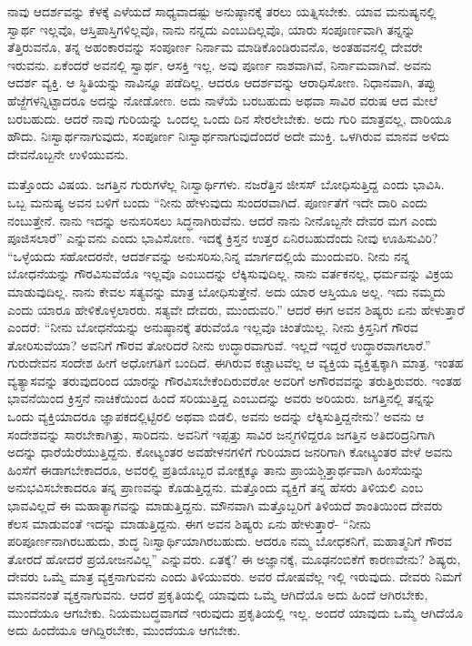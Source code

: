 ನಾವು ಆದರ್ಶವನ್ನು ಕೆಳಕ್ಕೆ ಎಳೆಯದೆ ಸಾಧ್ಯವಾದಷ್ಟು ಅನುಷ್ಠಾನಕ್ಕೆ ತರಲು ಯತ್ನಿಸಬೇಕು. ಯಾವ ಮನುಷ್ಯನಲ್ಲಿ ಸ್ವಾರ್ಥ ಇಲ್ಲವೊ, ಆಸ್ತಿಪಾಸ್ತಿಗಳಿಲ್ಲವೊ, ನಾನು ನನ್ನದು ಎಂಬುದಿಲ್ಲವೊ, ಯಾರು ಸಂಪೂರ್ಣವಾಗಿ ತನ್ನನ್ನು ತೆತ್ತಿರುವನೊ, ತನ್ನ ಅಹಂಕಾರವನ್ನು ಸಂಪೂರ್ಣ ನಿರ್ನಾಮ ಮಾಡಿಕೊಂಡಿರುವನೊ, ಅಂತಹವನಲ್ಲಿ ದೇವರೇ ಇರುವನು. ಏಕೆಂದರೆ ಅವನಲ್ಲಿ ಸ್ವಾರ್ಥ, ಆಸಕ್ತಿ ಇಲ್ಲ. ಅವು ಪೂರ್ಣ ನಾಶವಾಗಿವೆ, ನಿರ್ನಾಮ\-ವಾಗಿವೆ. ಅವನು ಆದರ್ಶ ವ್ಯಕ್ತಿ. ಆ ಸ್ಥಿತಿಯನ್ನು ನಾವಿನ್ನೂ ಪಡೆದಿಲ್ಲ. ಆದರೂ ಆದರ್ಶವನ್ನು ಆರಾಧಿಸೋಣ. ನಿಧಾನವಾಗಿ, ತಪ್ಪು ಹೆಜ್ಜೆಗಳನ್ನಿಟ್ಟಾದರೂ ಅದನ್ನು ನೋಡೋಣ. ಅದು ನಾಳೆಯೆ ಬರಬಹುದು ಅಥವಾ ಸಾವಿರ ವರುಷ ಆದ ಮೇಲೆ ಬರಬಹುದು. ಆದರೆ ನಾವು ಗುರಿಯನ್ನು ಒಂದಲ್ಲ ಒಂದು ದಿನ ಸೇರಲೇಬೇಕು. ಅದು ಗುರಿ ಮಾತ್ರವಲ್ಲ, ದಾರಿಯೂ ಹೌದು. ನಿಃಸ್ವಾರ್ಥನಾಗುವುದು, ಸಂಪೂರ್ಣ ನಿಃಸ್ವಾರ್ಥನಾಗುವುದೆಂದರೆ ಅದೇ ಮುಕ್ತಿ. ಒಳಗಿರುವ ಮಾನವ ಅಳಿದು ದೇವನೊಬ್ಬನೇ ಉಳಿಯುವನು.

ಮತ್ತೊಂದು ವಿಷಯ. ಜಗತ್ತಿನ ಗುರುಗಳೆಲ್ಲ ನಿಃಸ್ವಾರ್ಥಿಗಳು. ನಜರೆತ್ತಿನ ಜೀಸಸ್​ ಬೋಧಿಸುತ್ತಿದ್ದ ಎಂದು ಭಾವಿಸಿ. ಒಬ್ಬ ಮನುಷ್ಯ ಅವನ ಬಳಿಗೆ ಬಂದು “ನೀನು ಹೇಳುವುದು ಸುಂದರವಾಗಿದೆ. ಪೂರ್ಣತೆಗೆ ಇದೇ ದಾರಿ ಎಂದು ನಂಬುತ್ತೇನೆ. ನಾನು ಇದನ್ನು ಅನುಸರಿಸಲು ಸಿದ್ಧನಾಗಿರುವೆನು. ಆದರೆ ನಾನು ನೀನೊಬ್ಬನೇ ದೇವರ ಮಗ ಎಂದು ಪೂಜಿಸಲಾರೆ” ಎನ್ನುವನು ಎಂದು ಭಾವಿಸೋಣ. ಇದಕ್ಕೆ ಕ್ರಿಸ್ತನ ಉತ್ತರ ಏನಿರಬಹುದೆಂದು ನೀವು ಊಹಿಸುವಿರಿ? “ಒಳ್ಳೆಯದು ಸಹೋದರನೇ, ಆದರ್ಶವನ್ನು ಅನುಸರಿಸು,\break ನಿನ್ನ ಮಾರ್ಗದಲ್ಲಿಯೆ ಮುಂದುವರಿ. ನೀನು ನನ್ನ ಬೋಧನೆಯನ್ನು ಗೌರವಿಸುವೆಯೊ ಇಲ್ಲವೊ ಎಂಬುದನ್ನು ಲೆಕ್ಕಿಸುವುದಿಲ್ಲ. ನಾನು ವರ್ತಕನಲ್ಲ, ಧರ್ಮವನ್ನು ವಿಕ್ರಯ ಮಾಡುವುದಿಲ್ಲ. ನಾನು ಕೇವಲ ಸತ್ಯವನ್ನು ಮಾತ್ರ ಬೋಧಿಸುತ್ತೇನೆ. ಅದು ಯಾರ ಆಸ್ತಿಯೂ ಅಲ್ಲ. ಇದು ನಮ್ಮದು ಎಂದು ಯಾರೂ ಹೇಳಿಕೊಳ್ಳಲಾರರು. ಸತ್ಯವೇ ದೇವರು, ಮುಂದುವರಿ.” ಆದರೆ ಈಗ ಅವನ ಶಿಷ್ಯರು ಏನು ಹೇಳುತ್ತಾರೆ ಎಂದರೆ: “ನೀನು ಬೋಧನೆಯನ್ನು ಅನುಷ್ಠಾನಕ್ಕೆ ತರುವೆಯೊ ಇಲ್ಲವೊ ಚಿಂತೆಯಿಲ್ಲ. ನೀನು ಕ್ರಿಸ್ತನಿಗೆ ಗೌರವ ತೋರಿಸುವೆಯಾ? ಅವನಿಗೆ ಗೌರವ ತೋರಿದರೆ ನೀನು ಉದ್ಧಾರವಾಗುವೆ. ಇಲ್ಲದೆ ಇದ್ದರೆ ಉದ್ಧಾರವಾಗಲಾರೆ.” ಗುರುದೇವನ ಸಂದೇಶ ಹೀಗೆ ಅಧೋಗತಿಗೆ ಬಂದಿದೆ. ಈಗಿರುವ ಕಚ್ಚಾಟವೆಲ್ಲ ಆ ವ್ಯಕ್ತಿಯ ವ್ಯಕ್ತಿತ್ವಕ್ಕಾಗಿ ಮಾತ್ರ. ಇಂತಹ ವ್ಯತ್ಯಾಸವನ್ನು ತರುವುದರಿಂದ ಯಾರನ್ನು ಗೌರವಿಸಬೇಕೆಂದಿರುವರೋ ಅವರಿಗೆ ಅಗೌರವವನ್ನು ತರುತ್ತಿರುವರು. ಇಂತಹ ಭಾವನೆಯಿಂದ ಕ್ರಿಸ್ತನೆ ನಾಚಿಕೆಯಿಂದ ಹಿಂದೆ ಸರಿಯುತ್ತಿದ್ದ ಎಂಬುದನ್ನು ಅವರು ಅರಿಯರು. ಜಗತ್ತಿನಲ್ಲಿ ತನ್ನನ್ನು ಒಂದು ವ್ಯಕ್ತಿಯಾದರೂ ಜ್ಞಾಪಕದಲ್ಲಿಟ್ಟಿರಲಿ ಅಥವಾ ಬಿಡಲಿ, ಅವನು ಅದನ್ನು ಲೆಕ್ಕಿಸುತ್ತಿದ್ದನೇನು? ಅವನು ಆ ಸಂದೇಶವನ್ನು ಸಾರಬೇಕಾಗಿತ್ತು, ಸಾರಿದನು. ಅವನಿಗೆ ಇಪ್ಪತ್ತು ಸಾವಿರ ಜನ್ಮಗಳಿದ್ದರೂ ಜಗತ್ತಿನ ಅತಿದರಿದ್ರನಿಗಾಗಿ ಅದನ್ನು ಧಾರೆಯೆರೆಯುತ್ತಿದ್ದನು. ಕೋಟ್ಯಂತರ ಅವಹೇಳನಗಳಿಗೆ ಗುರಿಯಾದ ಜನರಿಗಾಗಿ ಕೋಟ್ಯಂತರ ವೇಳೆ ಅವನು ಹಿಂಸೆಗೆ ಈಡಾಗಬೇಕಾದರೂ, ಅವರಲ್ಲಿ ಪ್ರತಿಯೊಬ್ಬರ ಮೋಕ್ಷಕ್ಕೂ ತಾನು ಪ್ರಾಯಶ್ಚಿತ್ತಾರ್ಥವಾಗಿ ಹಿಂಸೆಯನ್ನು ಅನುಭವಿಸಬೇಕಾದರೂ ತನ್ನ ಪ್ರಾಣವನ್ನು ಕೊಡುತ್ತಿದ್ದನು. ಮತ್ತೊಂದು ವ್ಯಕ್ತಿಗೆ ತನ್ನ ಹೆಸರು ತಿಳಿಯಲಿ ಎಂಬ ಭಾವವಿಲ್ಲದೆ ಈ ಮಹಾತ್ಯಾಗವನ್ನು ಮಾಡುತ್ತಿದ್ದನು. ಮೌನವಾಗಿ ಮತ್ತೊಬ್ಬರಿಗೆ ತಿಳಿಯದೆ ಶಾಂತಿಯಿಂದ ದೇವರು ಕೆಲಸ ಮಾಡುವಂತೆ ಇದನ್ನು ಮಾಡುತ್ತಿದ್ದನು. ಈಗ ಅವನ ಶಿಷ್ಯರು ಏನು ಹೇಳುತ್ತಾರೆ- “ನೀನು ಪರಿಪೂರ್ಣನಾಗಿರಬಹುದು, ಶುದ್ಧ ನಿಃಸ್ವಾರ್ಥಿಯಾಗಿರಬಹುದು. ಆದರೂ ನಮ್ಮ ಬೋಧಕನಿಗೆ, ಮಹಾತ್ಮನಿಗೆ ಗೌರವ ತೋರದೆ ಹೋದರೆ ಪ್ರಯೋಜನವಿಲ್ಲ” ಎನ್ನುವರು. ಏತಕ್ಕೆ? ಈ ಅಜ್ಞಾನಕ್ಕೆ, ಮೂಢನಂಬಿಕೆಗೆ ಕಾರಣವೇನು? ಶಿಷ್ಯರು, ದೇವರು ಒಮ್ಮೆ ಮಾತ್ರ ವ್ಯಕ್ತನಾಗುವನು ಎಂದು ತಿಳಿಯುವರು. ಅವರ ದೋಷವೆಲ್ಲ ಇಲ್ಲಿ ಇರುವುದು. ದೇವರು ನಿಮಗೆ ಮಾನವನಂತೆ ವ್ಯಕ್ತನಾಗುವನು. ಆದರೆ ಪ್ರಕೃತಿಯಲ್ಲಿ ಯಾವುದು ಒಮ್ಮೆ ಆಗಿದೆಯೊ ಅದು ಹಿಂದೆ ಆಗಿರಬೇಕು, ಮುಂದೆಯೂ ಆಗಬೇಕು. ನಿಯಮಬದ್ಧವಾಗದೆ ಇರುವುದು ಪ್ರಕೃತಿಯಲ್ಲಿ ಇಲ್ಲ. ಅಂದರೆ ಯಾವುದು ಒಮ್ಮೆ ಆಗಿದೆಯೊ ಅದು ಹಿಂದೆಯೂ ಆಗಿದ್ದಿರಬೇಕು, ಮುಂದೆಯೂ ಆಗಬೇಕು.

